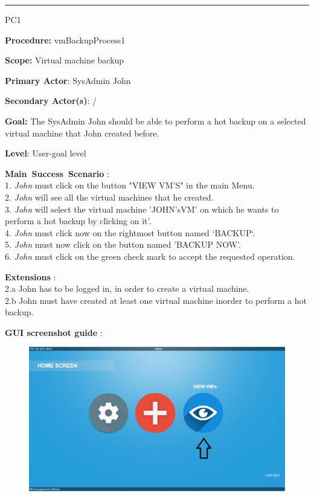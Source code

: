 \hrule
\vspace{0.5cm}
\begin{lyxlist}{PC1}
\small{
\item [\textbf{Procedure:}] vmBackupProcess1
\item [\textbf{Scope:}] Virtual machine backup
\item [\textbf{Primary Actor}:] SysAdmin John 
\item [\textbf{Secondary Actor(s)}:] /
\item [\textbf{Goal:}] The SysAdmin John should be able to perform a hot backup
on a selected virtual machine that John created before.
\item [\textbf{Level}:] User-goal level
\item [\textbf{Main~Success~Scenario}]:\\
1. \emph{John} must click on the button "VIEW VM'S" in the main Menu.\\
2. \emph{John} will see all the virtual machines that he created.\\
3. \emph{John} will select the virtual machine 'JOHN'sVM' on which he wants
to perform a hot backup by clicking on it'.\\
4. \emph{John} must click now on the rightmost button named `BACKUP`.\\
5. \emph{John} must now click on the button named 'BACKUP NOW'.\\
6. \emph{John} must click on the green check mark to accept the requested
operation.\\



\item [\textbf{Extensions}]:\\
2.a John has to be logged in, in order to create a virtual machine.\\
2.b John must have created at least one virtual machine inorder to perform a
hot backup.\\

\item [\textbf{GUI screenshot guide}]:\\
}


\begin{figure}[H]
\centering
\includegraphics[width=170mm]{images/createVMMod1.eps}
\caption{\label{overflow}}
\end{figure}



\end{lyxlist}
